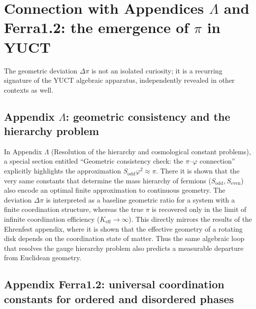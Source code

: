 \documentclass[11pt,a4paper]{article}
\begin{document}
	\section{Connection with Appendices \(\Lambda\) and Ferra1.2: the emergence of \(\pi\) in YUCT}
	
	The geometric deviation \(\Delta\pi\) is not an isolated curiosity; it is a recurring signature of the YUCT algebraic apparatus, independently revealed in other contexts as well.
	
	\subsection{Appendix \(\Lambda\): geometric consistency and the hierarchy problem}
	
	In Appendix \(\Lambda\) (Resolution of the hierarchy and cosmological constant problems), a special section entitled “Geometric consistency check: the \(\pi\)–\(\varphi\) connection” explicitly highlights the approximation \(S_{\mathrm{odd}}\varphi^2 \approx \pi\). There it is shown that the very same constants that determine the mass hierarchy of fermions (\(S_{\mathrm{odd}}, S_{\mathrm{even}}\)) also encode an optimal finite approximation to continuous geometry. The deviation \(\Delta\pi\) is interpreted as a baseline geometric ratio for a system with a finite coordination structure, whereas the true \(\pi\) is recovered only in the limit of infinite coordination efficiency (\(K_{\mathrm{eff}} \to \infty\)). This directly mirrors the results of the Ehrenfest appendix, where it is shown that the effective geometry of a rotating disk depends on the coordination state of matter. Thus the same algebraic loop that resolves the gauge hierarchy problem also predicts a measurable departure from Euclidean geometry.
	
	\subsection{Appendix Ferra1.2: universal coordination constants for ordered and disordered phases}
	
\end{document}
